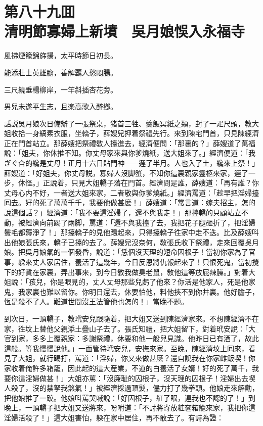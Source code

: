 
\chapter*{第八十九囬　\\清明節寡婦上新墳　吳月娘悞入永福寺}


\begin{myquote}
風拂煙籠錦旆揚，太平時節日初長。

能添壯士英雄膽，善解覊人愁悶腸。

三尺繞垂楊柳岸，一竿斜插杏花旁。

男兒未遂平生志，且楽高歌入醉鄉。
\end{myquote}

話説吳月娘次日備辦了一張祭桌，猪首三牲、羹飯冥紙之類，封了一疋尺頭，教大姐收拾一身縞素衣服，坐轎子，薛嫂兒押着祭禮先行。來到陳宅門首，只見陳經濟正在門首站立。那薛嫂把祭禮敎人擡進去，經濟便問：「那裏的？」薛嫂道了萬福說：「姐夫，你休推不知。你丈母家來與你爹燒紙，送大姐來了。」經濟便道：「我ぎぐ㒲的纔是丈母！正月十六日貼門神——遲了半月。人也入了土，纔來上祭！」薛嫂道：「好姐夫，你丈母説，寡婦人沒脚蟹，不知你這裏親家靈柩來家，遲了一步，休怪。」正說着，只見大姐轎子落在門首。經濟問是誰，薛嫂道：「再有誰？你丈母心内不好，一者送大姐來家，二者敬與你爹燒紙。」經濟罵道：「趁早把淫婦擡囘去。好的死了萬萬千千，我要他做甚麽！」薛嫂道：「常言道：嫁夫招主，怎的說這個話？」經濟道：「我不要這淫婦了，還不與我走！」那擡轎的只顧站立不動，被經濟向前踢了兩脚，罵道：「還不與我擡了去，我把花子腿砸折了，把淫婦鬢毛都薅淨了！」那擡轎子的見他踢起來，只得擡轎子徃家中走不迭。比及薛嫂呌出他娘張氏來，轎子已擡的去了。薛嫂兒沒奈何，敎張氏收下祭禮，走來回覆吳月娘。把吳月娘氣的一個發昏，說道：「恁個沒天理的短命囚根子！當初你家為了官事，躱來丈人家居住，養活了這幾年，今日反恩將仇報起來了！只恨死鬼，當初攪下的好貨在家裏，弄出事來，到今日敎我做臭老鼠，敎他這等放屁辣臊。」對着大姐說：「孩兒，你是眼見的，丈人丈母那些兒虧了他來？你活是他家人，死是他家鬼，我家裏也難以留你。你明日還去，休要怕他，料他挾不到你井裏。他好膽子，恆是殺不了人。難道世間沒王法管他也怎的！」當晚不題。

到次日，一頂轎子，教玳安兒跟隨着，把大姐又送到陳經濟家來。不想陳經濟不在家，徃坟上替他父親添土疊山子去了。張氏知禮，把大姐留下，對着玳安說：「大官到家，多多上覆親家：多謝祭禮，休要和他一般兒見識。他昨日已有酒了，故此這般。等我慢慢說他。」一面管待玳安兒，安撫來家。至晚，陳經濟坟上囘來，看見了大姐，就行踢打，罵道：「淫婦，你又來做甚麽？還自說我在你家雌飯喫！你家收着俺許多箱籠，因此起的這大産業，不道的白養活了女婿！好的死了萬千，我要你這淫婦做甚！」大姐亦罵：「沒廉耻的囚根子，沒天理的囚根子！淫婦出去喫人殺了，沒的禁拏我煞氣！」被經濟採過頂髮，儘力打了幾拳頭。他娘走來解勸，把他娘推了一跤。他娘呌罵哭喊說：「好囚根子，紅了眼，連我也不認的了！」到晚上，一頂轎子把大姐又送將來，吩咐道：「不討將寄放粧奩箱籠來家，我把你這淫婦活殺了！」這大姐害怕，躱在家中居住，再不敢去了。有詩為證：

